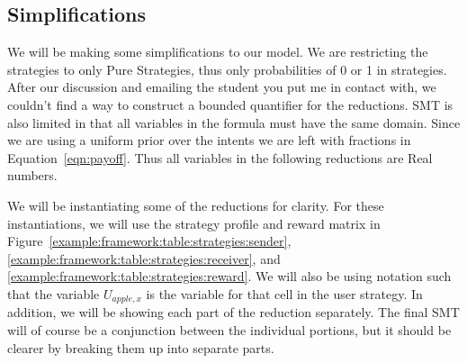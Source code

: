 \documentclass{article}
\begin{document}
\subsection{Simplifications}
\label{sec:simplifications}
We will be making some simplifications to our model. We are restricting the strategies to only Pure Strategies, thus only probabilities of 0 or 1 in strategies. After our discussion and emailing the student you put me in contact with, we couldn't find a way to construct a bounded quantifier for the reductions. SMT is also limited in that all variables in the formula must have the same domain. Since we are using a uniform prior over the intents we are left with fractions in Equation~\ref{eqn:payoff}. Thus all variables in the following reductions are Real numbers.

We will be instantiating some of the reductions for clarity. For these instantiations, we will use the strategy profile and reward matrix in Figure~\ref{example:framework:table:strategies:sender}, \ref{example:framework:table:strategies:receiver}, and \ref{example:framework:table:strategies:reward}. We will also be using notation such that the variable $U_{apple,x}$ is the variable for that cell in the user strategy. In addition, we will be showing each part of the reduction separately. The final SMT will of course be a conjunction between the individual portions, but it should be clearer by breaking them up into separate parts. 
\end{document}
